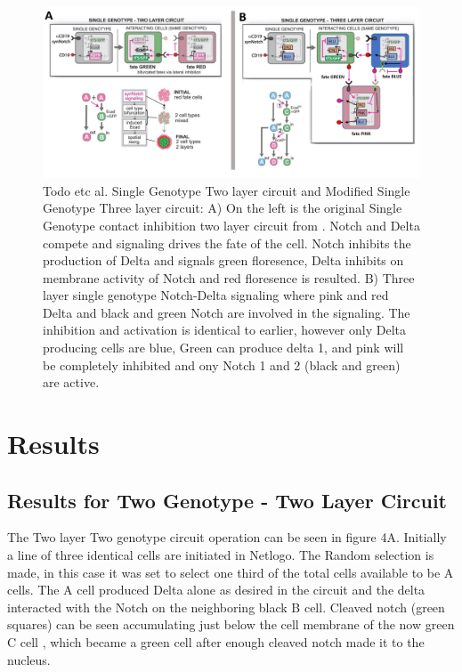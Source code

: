 \documentclass[12pt]{ifacconf}
\begin{document}
\begin{figure}
\begin{center}
\includegraphics[width=\textwidth]{Modification}    %
\caption{Todo etc al. Single Genotype Two layer circuit and Modified Single Genotype Three layer circuit: A) On the left is the original Single Genotype contact inhibition two layer circuit from \cite{TP:18}. Notch and Delta compete and signaling drives the fate of the cell. Notch inhibits the production of Delta and signals green floresence, Delta inhibits on membrane activity of Notch and red floresence is resulted. B) Three layer single genotype Notch-Delta signaling where pink and red Delta and black and green Notch are involved in the signaling. The inhibition and activation is identical to earlier, however only Delta producing cells are blue, Green can produce delta 1, and pink will be completely inhibited and ony Notch 1 and 2 (black and green) are active. } 
\label{fig:bifurcation}
\end{center}
\end{figure}

\section{Results}

\subsection{Results for Two Genotype -  Two Layer Circuit} 

The Two layer Two genotype circuit operation can be seen in figure 4A. Initially a line of three identical cells are initiated in Netlogo. The Random selection is made, in this case it was set to select one third of the total cells available to be A cells. The A cell produced Delta alone as desired in the circuit and the delta interacted with the Notch on the neighboring black B cell. Cleaved notch (green squares) can be seen accumulating just below the cell membrane of the now green C cell , which became a green cell after enough cleaved notch made it to the nucleus.
\end{document}
